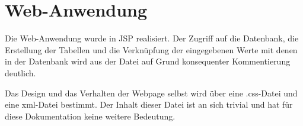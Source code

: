 \documentclass[11pt,a4paper,DIV=10,]{scrartcl}
\begin{document}
\section{Web-Anwendung}
Die Web-Anwendung wurde in JSP realisiert. Der Zugriff auf die Datenbank, die Erstellung der Tabellen und die Verknüpfung der eingegebenen Werte mit denen in der Datenbank wird aus der Datei auf Grund konsequenter Kommentierung deutlich.  



Das Design und das Verhalten der Webpage selbst wird über eine .css-Datei und eine xml-Datei bestimmt. Der Inhalt dieser Datei ist an sich trivial und hat für diese Dokumentation keine weitere Bedeutung. 



\end{document}
